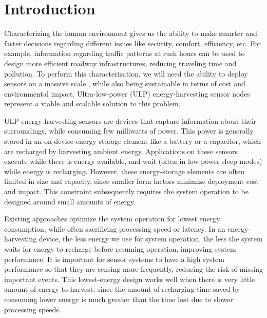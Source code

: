 \section{Introduction}
\label{sec:intro}

Characterizing the human environment gives us the ability to make smarter and faster decisions regarding different issues like security, comfort, efficiency, etc. 
%
For example, information regarding traffic patterns at rush hours can be used to design more efficient roadway infrastructures, reducing traveling time and pollution. 
%
To perform this characterization, we will need the ability to deploy sensors on a massive scale , while also being sustainable in terms of cost and environmental impact. 
%
Ultra-low-power (ULP) energy-harvesting sensor nodes represent a viable and scalable solution to this problem.

ULP energy-harvesting sensors are devices that capture information about their surroundings, while consuming few milliwatts of power. 
%
This power is generally stored in an on-device energy-storage element like a battery or a capacitor, which are recharged by harvesting ambient energy. 
%
Applications on these sensors execute while there is energy available, and wait (often in low-power sleep modes) while energy is recharging. 
%
However, these energy-storage elements are often limited in size and capacity, since smaller form factors minimize deployment cost and impact. 
%
This constraint subsequently requires the system operation to be designed around small amounts of energy.

Existing approaches optimize the system operation  for lowest energy consumption, while often sacrificing processing speed or latency. 
%
In an energy-harvesting device, the less energy we use for system operation, the less the system waits for energy to recharge before resuming operation, improving system performance. 
%
It is important for sensor systems to have a high system performance so that they are sensing more frequently, reducing the risk of missing important events. 
%
This lowest-energy design works well when there is very little amount of energy to harvest, since the amount of recharging time saved by consuming lower energy is much greater than the time lost due to slower processing speeds.

